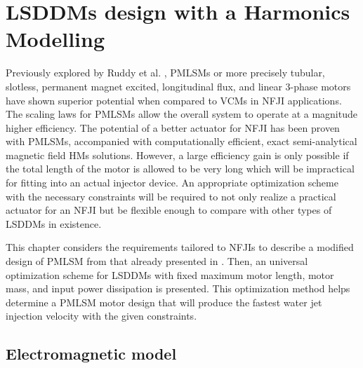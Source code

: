 \chapter{\acsp{LSDDM} design with a Harmonics Modelling}   \label{Chapter:PMLSM design HM}


    Previously explored by Ruddy et al. \cite{Ruddy2015}, \acsp{PMLSM} or more precisely tubular, slotless, permanent magnet excited, longitudinal flux, and linear 3-phase motors have shown superior potential when compared to \acsp{VCM} in \acs{NFJI} applications. The scaling laws for \acsp{PMLSM} allow the overall system to operate at a magnitude higher efficiency. The potential of a better actuator for \acs{NFJI} has been proven with \acsp{PMLSM}, accompanied with computationally efficient, exact semi-analytical magnetic field \acsp{HM} solutions. However, a large efficiency gain is only possible if the total length of the motor is allowed to be very long which will be impractical for fitting into an actual injector device. An appropriate optimization scheme with the necessary constraints will be required to not only realize a practical actuator for an \acs{NFJI} but be flexible enough to compare with other types of \acsp{LSDDM} in existence.
    
    
    This chapter considers the requirements tailored to \acsp{NFJI} to describe a modified design of \acs{PMLSM} from that already presented in \cite{Ruddy2015}. Then, an universal optimization scheme for \acsp{LSDDM} with fixed maximum motor length, motor mass, and input power dissipation is presented. This optimization method helps determine a \acs{PMLSM} motor design that will produce the fastest water jet injection velocity with the given constraints. 


\section{Electromagnetic model}                 \label{Chapter:PMLSM design HM/electromagnetic model}


